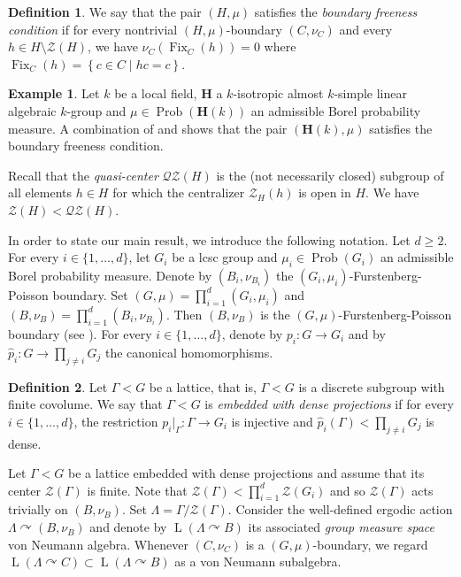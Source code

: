 \documentclass[JEP,XML,SOM,Unicode,published]{cedram}
\newcommand{\bH}{\boldsymbol{H}}
\theoremstyle{definition}
\newtheorem*{example}{Example}
\newtheorem*{definition}{Definition}
\DeclareMathOperator{\Fix}{Fix}
\DeclareMathOperator{\Prob}{Prob}
\DeclareMathOperator{\rL}{L}
\begin{document}
\begin{definition}
We say that the pair $(H, \mu)$ satisfies the \emph{boundary freeness condition} if for every nontrivial $(H, \mu)$-boundary $(C, \nu_C)$ and every $h \in H \setminus \mathscr Z(H)$, we have $\nu_C(\Fix_C(h)) = 0$ where $\Fix_C(h) = \left\{c \in C \mid hc = c \right\}$.
\end{definition}

\begin{example}
Let $k$ be a local field, $\bH$ a $k$-isotropic almost $k$-simple linear algebraic $k$-group and $\mu \in \Prob(\bH(k))$ an admissible Borel probability measure. A combination of \cite[Cor.\,5.2]{BS04} and \cite[Lem.\,6.2]{BBHP20} shows that the pair $(\bH(k), \mu)$ satisfies the boundary freeness condition.
\end{example}

Recall that the \emph{quasi-center} $\mathscr{Q}\mathscr{Z}(H)$ is the (not necessarily closed) subgroup of all elements $h \in H$ for which the centralizer $\mathscr Z_H(h)$ is open in $H$. We have $\mathscr Z(H) < \mathscr{Q}\mathscr{Z}(H)$.

In order to state our main result, we introduce the following notation. Let $d \geq 2$. For every $i \in \{1, \dots, d\}$, let $G_i$ be a lcsc group and $\mu_i \in \Prob(G_i)$ an admissible Borel probability measure. Denote by $(B_i, \nu_{B_i})$ the $(G_i, \mu_i)$-Furstenberg-Poisson boundary. Set $(G, \mu) = \prod_{i = 1}^d (G_i, \mu_i)$ and $(B, \nu_B) = \prod_{i = 1}^d (B_i, \nu_{B_i})$. Then $(B, \nu_B)$ is the $(G, \mu)$-Furstenberg-Poisson boundary (see \cite[Cor.\,3.2]{BS04}). For every $i \in \{1, \dots, d\}$, denote by $p_i : G \to G_i$ and by $\widehat p_i : G \to \prod_{j \neq i} G_j$ the canonical homomorphisms.

\begin{definition}
Let $\Gamma < G$ be a lattice, that is, $\Gamma < G$ is a discrete subgroup with finite covolume. We say that $\Gamma < G$ is \emph{embedded with dense projections} if for every $i \in \{1, \dots, d\}$, the restriction $p_i|_\Gamma : \Gamma \to G_i$ is injective and $\widehat p_i(\Gamma) < \prod_{j \neq i} G_j$ is dense.
\end{definition}

Let $\Gamma < G$ be a lattice embedded with dense projections and assume that its center $\mathscr Z(\Gamma)$ is finite. Note that $\mathscr Z(\Gamma) < \prod_{i = 1}^d \mathscr Z(G_i)$ and so $\mathscr Z(\Gamma)$ acts trivially on $(B, \nu_B)$. Set $\Lambda = \Gamma/\mathscr Z(\Gamma)$. Consider the well-defined ergodic action $\Lambda \curvearrowright (B, \nu_B)$ and denote by $\rL(\Lambda \curvearrowright B)$ its associated \emph{group measure space} von Neumann algebra. Whenever $(C, \nu_C)$ is a $(G, \mu)$-boundary, we regard $\rL(\Lambda \curvearrowright C) \subset \rL(\Lambda \curvearrowright B)$ as a von Neumann subalgebra.
\end{document}
